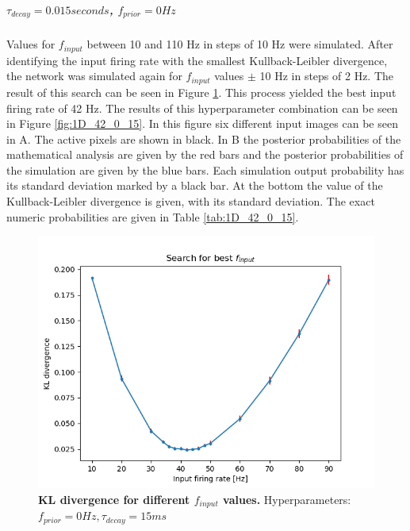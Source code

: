 \subparagraph{$\tau_{decay} = 0.015 seconds$, $f_{prior} = 0 Hz$}
Values for $f_{input}$ between 10 and 110 Hz in steps of 10 Hz were simulated. After identifying the input firing rate with the smallest Kullback-Leibler divergence, the network was simulated again for $f_{input}$ values $\pm$ 10 Hz in steps of 2 Hz. The result of this search can be seen in Figure \ref{fig:1D_KLD_fPrior0_tau15}. This process yielded the best input firing rate of 42 Hz. The results of this hyperparameter combination can be seen in Figure \ref{fig:1D_42_0_15}. In this figure six different input images can be seen in A. The active pixels are shown in black. In B the posterior probabilities of the mathematical analysis are given by the red bars and the posterior probabilities of the simulation are given by the blue bars. Each simulation output probability has its standard deviation marked by a black bar. At the bottom the value of the Kullback-Leibler divergence is given, with its standard deviation. The exact numeric probabilities are given in Table \ref{tab:1D_42_0_15}.

\begin{figure}
\centering
  \includegraphics[width=0.75\linewidth]{figures/1D/KLDvsfInput_fPrior0tau15.png}
  \caption{\textbf{KL divergence for different $f_{input}$ values. } Hyperparameters: $f_{prior} = 0 Hz, \tau_{decay} = 15 ms$}
  \label{fig:1D_KLD_fPrior0_tau15}
\end{figure}

